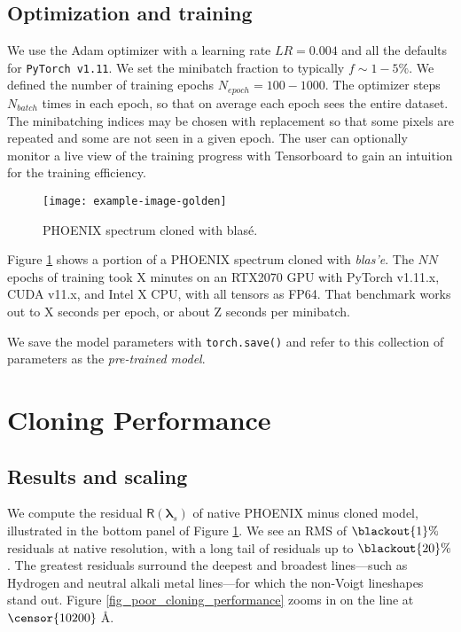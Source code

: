 \documentclass[modern]{aastex631}
\begin{document}
\subsection{Optimization and training}

We use the Adam optimizer with a learning rate $LR=0.004$ and all the defaults for \texttt{PyTorch v1.11}.  We set the minibatch fraction to typically $f\sim1-5\%$.  We defined the number of training epochs $N_{epoch}=100-1000$.  The optimizer steps $N_{batch}$ times in each epoch, so that on average each epoch sees the entire dataset.  The minibatching indices may be chosen with replacement so that some pixels are repeated and some are not seen in a given epoch.  The user can optionally monitor a live view of the training progress with Tensorboard to gain an intuition for the training efficiency.


\begin{figure}[hbt!]
  \centering
  \texttt{[image: example-image-golden]}
  \caption{PHOENIX spectrum cloned with blas\'e.}
  \label{fig_cloned_spectrum_demo}
\end{figure}

Figure \ref{fig_cloned_spectrum_demo} shows a portion of a PHOENIX spectrum cloned with \emph{blas'e}.  The $NN$ epochs of training took X minutes on an RTX2070 GPU with PyTorch v1.11.x, CUDA v11.x, and Intel X CPU, with all tensors as FP64.  That benchmark works out to X seconds per epoch, or about Z seconds per minibatch.

We save the model parameters with \texttt{torch.save()} and refer to this collection of parameters as the \emph{pre-trained model}.

\section{Cloning Performance}

\subsection{Results and scaling}

We compute the residual $\mathsf{R}(\bm{\lambda}_s)$ of native PHOENIX minus cloned model, illustrated in the bottom panel of Figure \ref{fig_cloned_spectrum_demo}.  We see an RMS of $\blackout{1}\%$ residuals at native resolution, with a long tail of residuals up to $\blackout{20}\%$.  The greatest residuals surround the deepest and broadest lines---such as Hydrogen and neutral alkali metal lines---for which the non-Voigt lineshapes stand out.  Figure \ref{fig_poor_cloning_performance} zooms in on the  line at $\censor{10200}\;$\AA.
\end{document}
